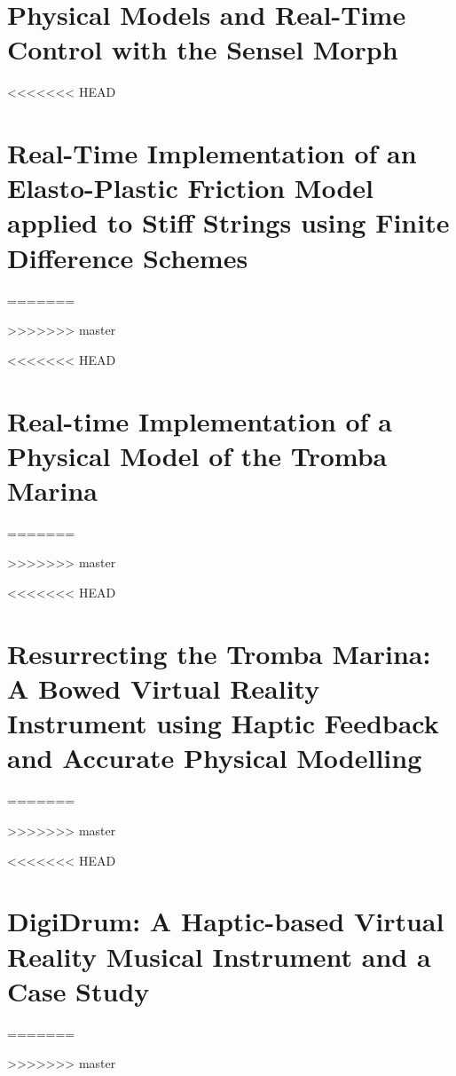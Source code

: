 
\ifpapers
    
\fi

\chapter{Physical Models and Real-Time Control with the Sensel Morph}\label{paper:B}
\ifpapers
    
\fi

<<<<<<< HEAD
\chapter{Real-Time Implementation of an Elasto-Plastic Friction Model applied to Stiff Strings using Finite Difference Schemes}\label{paper:C}
=======

>>>>>>> master
\ifpapers
    
\fi

<<<<<<< HEAD
\chapter{Real-time Implementation of a Physical Model of the Tromba Marina}\label{paper:D}
=======

>>>>>>> master
\ifpapers
    
\fi

<<<<<<< HEAD
\chapter{Resurrecting the Tromba Marina: A Bowed Virtual Reality Instrument using Haptic Feedback and Accurate Physical Modelling}\label{paper:E}
=======

>>>>>>> master
\ifpapers
    
\fi

<<<<<<< HEAD
\chapter{DigiDrum: A Haptic-based Virtual Reality Musical Instrument and a Case Study}\label{paper:F}
=======

>>>>>>> master
\ifpapers
    
\fi

